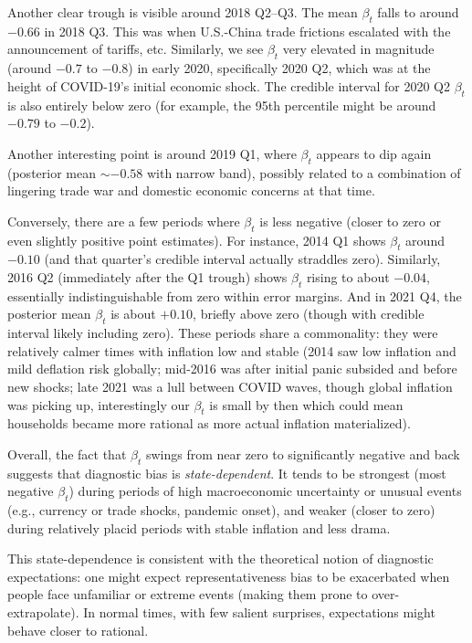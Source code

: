 \documentclass[12pt]{article}
\begin{document}
Another clear trough is visible around 2018 Q2--Q3. The mean $\beta_t$ falls to around $-0.66$ in 2018 Q3. This was when U.S.-China trade frictions escalated with the announcement of tariffs, etc. Similarly, we see $\beta_t$ very elevated in magnitude (around $-0.7$ to $-0.8$) in early 2020, specifically 2020 Q2, which was at the height of COVID-19's initial economic shock. The credible interval for 2020 Q2 $\beta_t$ is also entirely below zero (for example, the 95th percentile might be around $-0.79$ to $-0.2$).

Another interesting point is around 2019 Q1, where $\beta_t$ appears to dip again (posterior mean $\sim -0.58$ with narrow band), possibly related to a combination of lingering trade war and domestic economic concerns at that time.

Conversely, there are a few periods where $\beta_t$ is less negative (closer to zero or even slightly positive point estimates). For instance, 2014 Q1 shows $\beta_t$ around $-0.10$ (and that quarter's credible interval actually straddles zero). Similarly, 2016 Q2 (immediately after the Q1 trough) shows $\beta_t$ rising to about $-0.04$, essentially indistinguishable from zero within error margins. And in 2021 Q4, the posterior mean $\beta_t$ is about $+0.10$, briefly above zero (though with credible interval likely including zero). These periods share a commonality: they were relatively calmer times with inflation low and stable (2014 saw low inflation and mild deflation risk globally; mid-2016 was after initial panic subsided and before new shocks; late 2021 was a lull between COVID waves, though global inflation was picking up, interestingly our $\beta_t$ is small by then which could mean households became more rational as more actual inflation materialized).

Overall, the fact that $\beta_t$ swings from near zero to significantly negative and back suggests that diagnostic bias is \textit{state-dependent}. It tends to be strongest (most negative $\beta_t$) during periods of high macroeconomic uncertainty or unusual events (e.g., currency or trade shocks, pandemic onset), and weaker (closer to zero) during relatively placid periods with stable inflation and less drama.

This state-dependence is consistent with the theoretical notion of diagnostic expectations: one might expect representativeness bias to be exacerbated when people face unfamiliar or extreme events (making them prone to over-extrapolate). In normal times, with few salient surprises, expectations might behave closer to rational.
\end{document}
